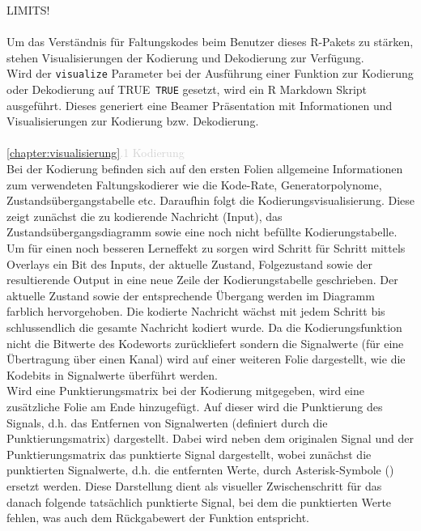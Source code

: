 LIMITS!\\\\
Um das Verständnis für Faltungskodes beim Benutzer dieses R-Pakets zu stärken, stehen Visualisierungen der Kodierung und Dekodierung zur Verfügung.
\\
Wird der \texttt{visualize} Parameter bei der Ausführung einer Funktion zur Kodierung oder Dekodierung auf TRUE~\texttt{TRUE} gesetzt, wird ein R Markdown Skript ausgeführt. Dieses generiert eine Beamer Präsentation mit Informationen und Visualisierungen zur Kodierung bzw. Dekodierung.
\\\\
\textcolor{lightgray}{\ref{chapter:visualisierung}.1 Kodierung}\\
Bei der Kodierung befinden sich auf den ersten Folien allgemeine Informationen zum verwendeten Faltungskodierer wie die Kode-Rate, Generatorpolynome, Zustandsübergangstabelle etc. 
Daraufhin folgt die Kodierungsvisualisierung. Diese zeigt zunächst die zu kodierende Nachricht (Input), das Zustandsübergangsdiagramm sowie eine noch nicht befüllte Kodierungstabelle. Um für einen noch besseren Lerneffekt zu sorgen wird Schritt für Schritt mittels Overlays ein Bit des Inputs, der aktuelle Zustand, Folgezustand sowie der resultierende Output in eine neue Zeile der Kodierungstabelle geschrieben. Der aktuelle Zustand sowie der entsprechende Übergang werden im Diagramm farblich hervorgehoben. Die kodierte Nachricht wächst mit jedem Schritt bis schlussendlich die gesamte Nachricht kodiert wurde.
Da die Kodierungsfunktion nicht die Bitwerte des Kodeworts zurückliefert sondern die Signalwerte (für eine Übertragung über einen Kanal) wird auf einer weiteren Folie dargestellt, wie die Kodebits in Signalwerte überführt werden.\\
Wird eine Punktierungsmatrix bei der Kodierung mitgegeben, wird eine zusätzliche Folie am Ende hinzugefügt. Auf dieser wird die Punktierung des Signals, d.h. das Entfernen von Signalwerten (definiert durch die Punktierungsmatrix) dargestellt. Dabei wird neben dem originalen Signal und der Punktierungsmatrix das punktierte Signal dargestellt, wobei zunächst die punktierten Signalwerte, d.h. die entfernten Werte, durch Asterisk-Symbole (\textasteriskcentered) ersetzt werden. Diese Darstellung dient als visueller Zwischenschritt für das danach folgende tatsächlich punktierte Signal, bei dem die punktierten Werte fehlen, was auch dem Rückgabewert der Funktion entspricht.
